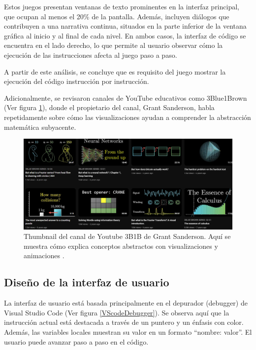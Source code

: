 Estos juegos presentan ventanas de texto prominentes en la interfaz principal, que ocupan al menos el 20\% de la pantalla. Además, incluyen diálogos que contribuyen a una narrativa continua, situados en la parte inferior de la ventana gráfica al inicio y al final de cada nivel. En ambos casos, la interfaz de código se encuentra en el lado derecho, lo que permite al usuario observar cómo la ejecución de las instrucciones afecta al juego paso a paso.

A partir de este análisis, se concluye que es requisito del juego mostrar la ejecución del código instrucción por instrucción.

Adicionalmente, se revisaron canales de YouTube educativos como 3Blue1Brown \cite{3Blue1BrownYT} (Ver figura \ref{3B1BYTChannelThumbnail}), donde el propietario del canal, Grant Sanderson, habla repetidamente sobre cómo las visualizaciones ayudan a comprender la abstracción matemática subyacente. 

\begin{figure}[!h]
	\centering
	\includegraphics[scale=0.5]{imagenes/3B1BChannel.png}
	\caption{Thumbnail del canal de Youtube 3B1B de Grant Sanderson. Aquí se muestra cómo explica conceptos abstractos con visualizaciones y animaciones \cite{3Blue1BrownYT}.}
	\label{3B1BYTChannelThumbnail}
\end{figure}


\subsection{Diseño de la interfaz de usuario}


La interfaz de usuario está basada principalmente en el depurador (debugger) de Visual Studio Code \cite{vscode} (Ver figura \ref{VScodeDebugger}). Se observa aquí que la instrucción actual está destacada a través de un puntero y un énfasis con color. Además, las variables locales muestran su valor en un formato “nombre: valor”. El usuario puede avanzar paso a paso en el código.

